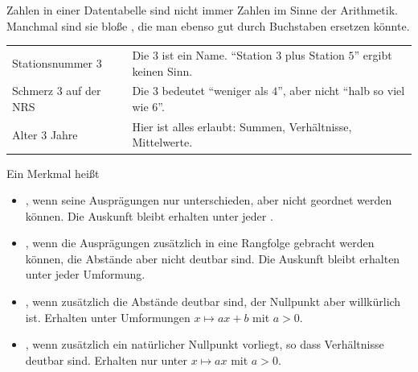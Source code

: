 \begin{merksatz}
Zahlen in einer Datentabelle sind nicht immer Zahlen im Sinne der Arithmetik. Manchmal sind sie bloße , die man ebenso gut durch Buchstaben ersetzen könnte.

\begin{center}
\renewcommand{\arraystretch}{1.5}
\begin{tabular}{@{}P{3.0cm}P{5.6cm}@{}}
\toprule
Stations\-nummer $3$ & Die $3$ ist ein Name. \enquote{Station $3$ plus Station $5$} ergibt keinen Sinn.\\
Schmerz $3$ auf der NRS & Die $3$ bedeutet \enquote{weniger als $4$}, aber nicht \enquote{halb so viel wie $6$}.\\
Alter $3$ Jahre & Hier ist alles erlaubt: Summen, Verhältnisse, Mittelwerte.\\
\bottomrule
\end{tabular}
\end{center}

\begin{center}
\begin{minipage}{0.88\textwidth}
\end{minipage}
\end{center}
\end{merksatz}

\begin{definition}
Ein Merkmal heißt

\begin{itemize}[leftmargin=1.4em, itemsep=5pt]
\item {}, wenn seine Ausprägungen nur unterschieden, aber nicht geordnet werden können. Die Auskunft bleibt erhalten unter jeder .

\item {}, wenn die Ausprägungen zusätzlich in eine Rangfolge gebracht werden können, die Abstände aber nicht deutbar sind. Die Auskunft bleibt erhalten unter jeder  Umformung.

\item {}, wenn zusätzlich die Abstände deutbar sind, der Nullpunkt aber willkürlich ist. Erhalten unter Umformungen $x \mapsto a x + b$ mit $a > 0$.

\item {}, wenn zusätzlich ein natürlicher Nullpunkt vorliegt, so dass Verhältnisse deutbar sind. Erhalten nur unter $x \mapsto a x$ mit $a > 0$.
\end{itemize}
\end{definition}

